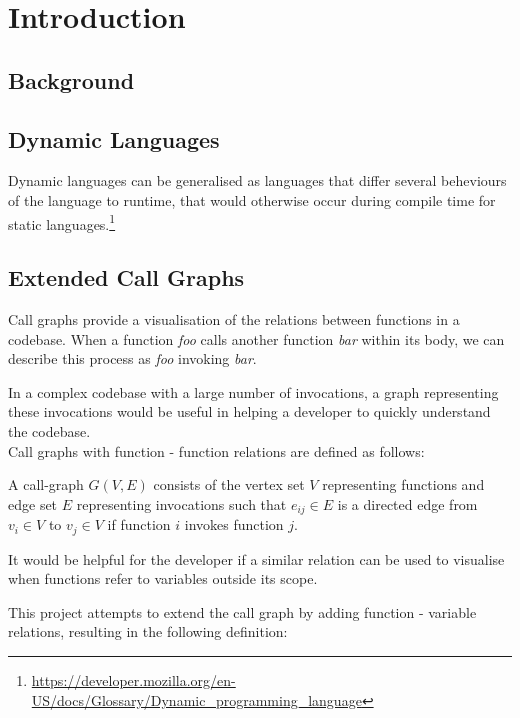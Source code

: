 \chapter{Introduction}

\section{Background}

\section{Dynamic Languages}

Dynamic languages can be generalised as languages that differ several beheviours of the language to runtime, that would otherwise occur during compile time for static languages.\footnote{\url{https://developer.mozilla.org/en-US/docs/Glossary/Dynamic_programming_language}}

\section{Extended Call Graphs}

Call graphs provide a visualisation of the relations between functions in a codebase. When a function \textit{foo} calls another function \textit{bar} within its body, we can describe this process as \textit{foo} invoking \textit{bar}.



In a complex codebase with a large number of invocations, a graph representing these invocations would be useful in helping a developer to quickly understand the codebase.
\\
Call graphs with function - function relations are defined as follows:

\begin{definition}
    A call-graph $G(V, E)$ consists of the vertex set $V$ representing functions and edge set $E$ representing invocations such that $e_{ij}\in{E}$ is a directed edge from $v_i\in{V}$ to $v_j\in{V}$ if function $i$ invokes function $j$. 
\end{definition}

It would be helpful for the developer if a similar relation can be used to visualise when functions refer to variables outside its scope.



This project attempts to extend the call graph by adding function - variable relations, resulting in the following definition:


